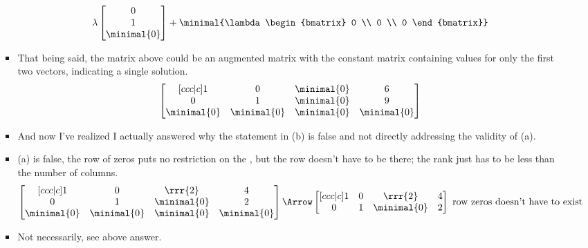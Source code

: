 \documentclass[basic]{inVerba-notes}
\begin{document}
\begin{enumerate}
\begin{enumerate}
\begin{itemize}
\[    \lambda\begin{bmatrix} 0 \\ 1 \\ \minimal{0} \end{bmatrix} + 
    \minimal{\lambda\begin{bmatrix} 0 \\ 0 \\ 0 \end{bmatrix}}
    \]%
    \item That being said, the matrix above could be an augmented matrix with the constant matrix containing values for only the first two vectors, indicating a single solution. 
    \[%
    \begin{bmatrix}[ccc|c]
    1 & 0 & \minimal{0} & 6 \\
    0 & 1 & \minimal{0} & 9 \\
    \minimal{0} & \minimal{0} & \minimal{0} & \minimal{0}
    \end{bmatrix}
    \]%
    \item And now I've realized I actually answered why the statement in (b) is false and not directly addressing the validity of (a).
    \item (a) is false, the row of zeros puts no restriction on the , but the row doesn't have to be there; the rank just has to be less than the number of columns. 
    \[%
    \begin{bmatrix}[ccc|c]
      1 & 0 & \rrr{2} & 4 \\
      0 & 1 & \minimal{0} & 2 \\
      \minimal{0} & \minimal{0} & \minimal{0} & \minimal{0}
    \end{bmatrix}
    \Arrow 
    \begin{bmatrix}[ccc|c]
      1 & 0 & \rrr{2} & 4 \\
      0 & 1 & \minimal{0} & 2 \\
    \end{bmatrix}~\text{row zeros doesn't have to exist}
    \]%
    \end{itemize}
    \begin{itemize}
      \item Not necessarily, see above answer.

\end{itemize}
\end{enumerate}
\end{enumerate}
\end{document}

